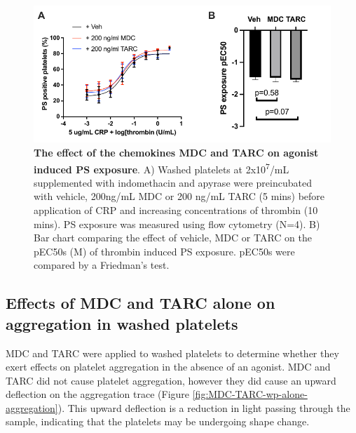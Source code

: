 \documentclass[11pt,twoside]{bristolthesis}
\begin{document}
\begin{figure}

{\centering \includegraphics{figure/Chemokines/Layouts/MDC_TARC_PS_exposure_layout} 

}

\caption[The effect of the chemokines MDC and TARC on agonist induced PS exposure]{\textbf{The effect of the chemokines MDC and TARC on agonist induced PS exposure}. A) Washed platelets at 2x10\textsuperscript{7}/mL supplemented with indomethacin and apyrase were preincubated with vehicle, 200ng/mL MDC or 200 ng/mL TARC (5 mins) before application of CRP and increasing concentrations of thrombin (10 mins). PS exposure was measured using flow cytometry (N=4). B) Bar chart comparing the effect of vehicle, MDC or TARC on the pEC50s (M) of thrombin induced PS exposure. pEC50s were compared by a Friedman's test.}\label{fig:MDC-TARC-PS-exposure}
\end{figure}
\hypertarget{effects-of-mdc-and-tarc-alone-on-aggregation-in-washed-platelets}{%
\subsection{Effects of MDC and TARC alone on aggregation in washed platelets}\label{effects-of-mdc-and-tarc-alone-on-aggregation-in-washed-platelets}}

MDC and TARC were applied to washed platelets to determine whether they exert effects on platelet aggregation in the absence of an agonist. MDC and TARC did not cause platelet aggregation, however they did cause an upward deflection on the aggregation trace (Figure \ref{fig:MDC-TARC-wp-alone-aggregation}). This upward deflection is a reduction in light passing through the sample, indicating that the platelets may be undergoing shape change.
\end{document}
